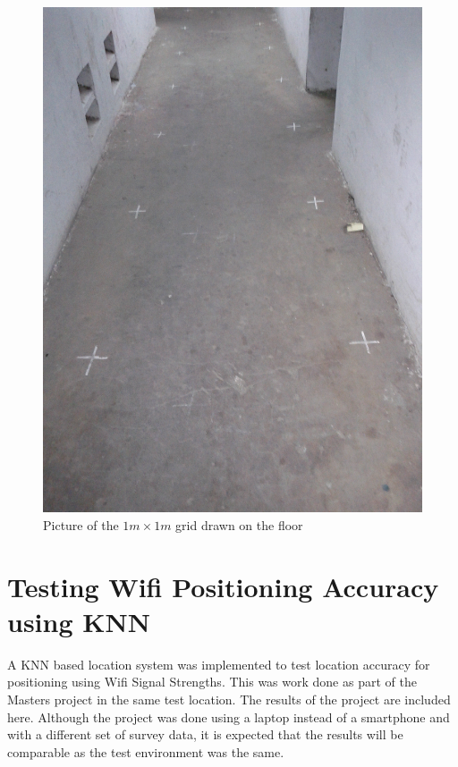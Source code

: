 \begin{figure}
    \centering
    \includegraphics[width=5in,angle=270]{figures/grid_pic}
    \caption{Picture of the $1m \times 1m$ grid drawn on the floor\label{fig:grid_pic}}
\end{figure}

\section{Testing Wifi Positioning Accuracy using KNN\label{sec:knn_pos}}

A KNN based location system was implemented to test location accuracy for positioning using Wifi Signal Strengths. 
This was work done as part of the Masters project in the same test location. 
The results of the project are included here. Although the project was 
done using a laptop instead of a smartphone and with a different set of survey data, 
it is expected that the results will be comparable as the test environment was the same.

